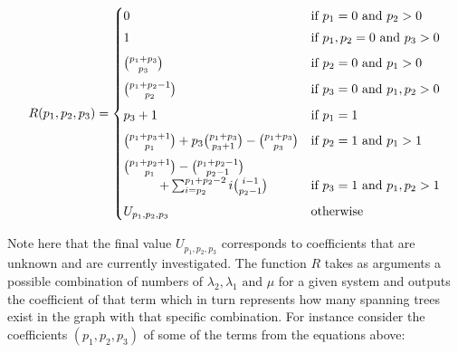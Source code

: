 \begin{equation} \label{eq:coefficient_function}
    R(p_1,p_2,p_3) =
    \begin{cases}
        0 & \text{if } p_1 = 0 \text{ and } p_2 > 0 \vspace{0.1cm} \\
        1 & \text{if } p_1, p_2 = 0 \text{ and } p_3 > 0 \vspace{0.2cm} \\
        \binom{p_1 + p_3}{p_3} & \text{if } p_2 = 0
        \text{ and } p_1 > 0 \vspace{0.2cm} \\
        \binom{p_1 + p_2 - 1}{p_2} & \text{if } p_3 = 0
        \text{ and } p_1, p_2 > 0 \vspace{0.2cm} \\
        p_3 + 1 & \text{if } p_1 = 1 \vspace{0.2cm} \\
        \binom{p_1 + p_3 + 1}{p_1} + p_3 \binom{p_1 + p_3}{p_3+1} -
        \binom{p_1 + p_3}{p_3} & \text{if } p_2 = 1
        \text{ and } p_1 > 1 \vspace{0.2cm} \\
        \binom{p_1 + p_2 + 1}{p_1} - \binom{p_1 + p_2 - 1}{p_2-1} & \\
        \hspace{1cm} + \sum_{i=p_2}^{p_1 + p_2 - 2} i \binom{i-1}{p_2 - 1} &
        \text{if } p_3 = 1
        \text{ and } p_1,p_2 > 1 \vspace{0.2cm} \\
        U_{p_1,p_2,p_3} & \text{otherwise}
    \end{cases}
\end{equation}

Note here that the final value \(U_{p_1,p_2,p_3}\) corresponds to coefficients
that are unknown and are currently investigated.
The function \(R\) takes as arguments a possible combination of numbers of
\(\lambda_2, \lambda_1 \text{ and } \mu \) for a given system and outputs the
coefficient of that term which in turn represents how many spanning trees exist
in the graph with that specific combination.
For instance consider the coefficients \((p_1,p_2,p_3)\) of some of the terms
from the equations above:

